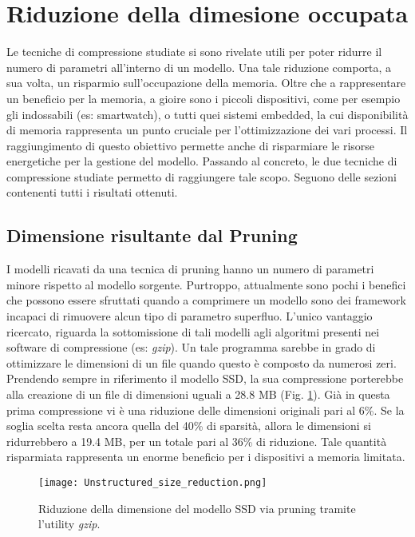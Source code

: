 \section{Riduzione della dimesione occupata}
Le tecniche di compressione studiate si sono rivelate utili per poter ridurre il 
numero di parametri all'interno di un modello. Una tale riduzione comporta, 
a sua volta, un risparmio sull'occupazione della memoria. Oltre che a 
rappresentare un beneficio per la memoria, a gioire sono i piccoli dispositivi, 
come per esempio gli indossabili (es: smartwatch), o tutti quei sistemi 
embedded, la cui disponibilità di memoria rappresenta un punto cruciale 
per l'ottimizzazione dei vari processi. Il raggiungimento di questo obiettivo 
permette anche di risparmiare le risorse energetiche  per la gestione del 
modello. Passando al concreto, le due tecniche di compressione studiate 
permetto di raggiungere tale scopo. Seguono delle sezioni contenenti tutti i 
risultati ottenuti.

\subsection{Dimensione risultante dal Pruning}
I modelli ricavati da una tecnica di pruning hanno un numero di parametri 
minore rispetto al modello sorgente. Purtroppo, attualmente sono pochi 
i benefici che possono essere sfruttati quando a comprimere un modello 
sono dei framework incapaci di rimuovere alcun tipo di parametro superfluo. 
L'unico vantaggio ricercato, riguarda la sottomissione di tali modelli agli 
algoritmi presenti nei software di compressione (es: \emph{gzip}). Un tale programma 
sarebbe in grado di ottimizzare le dimensioni di un file quando questo 
è composto da numerosi zeri. Prendendo sempre in riferimento il modello 
SSD, la sua compressione porterebbe alla creazione di un file di dimensioni 
uguali a 28.8 MB (Fig. \ref{SSD_dim}). Già in questa prima compressione vi è una 
riduzione delle dimensioni originali pari al 6\%. Se la soglia scelta resta 
ancora quella del 40\% di sparsità, allora le dimensioni si ridurrebbero a 
19.4 MB, per un totale pari al 36\% di riduzione. Tale quantità risparmiata 
rappresenta un enorme beneficio per i dispositivi a memoria limitata.
\begin{figure}
    \centering
    \texttt{[image: Unstructured\_size\_reduction.png]}
    \centering
    \caption{Riduzione della dimensione del modello SSD via pruning tramite l'utility \emph{gzip}.}
    \label{SSD_dim}
\end{figure}

